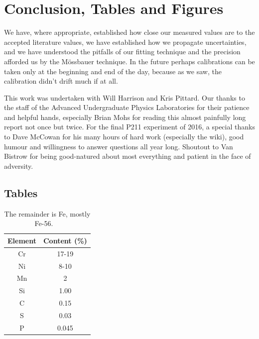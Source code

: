 \documentclass[reprint, nobibnotes, amssymb, amsmath, amsfonts, mathtools, mathrsfs, floatfix]{revtex4-1}
\newcommand{\moss}{M\"{o}ssbauer }
\begin{document}
  \section{Conclusion, Tables and Figures}
    We have, where appropriate, established how close our measured values are to the accepted literature values, we have established how we propagate uncertainties, and we have understood the pitfalls of our fitting technique and the precision afforded us by the \moss technique.  In the future perhaps calibrations can be taken only at the beginning and end of the day, because as we saw, the calibration didn't drift much if at all.

    This work was undertaken with Will Harrison and Kris Pittard.  Our thanks to the staff of the Advanced Undergraduate Physics Laboratories for their patience and helpful hands, especially Brian Mohs for reading this almost painfully long report not once but twice.  For the final P211 experiment of 2016, a special thanks to Dave McCowan for his many hours of hard work (especially the wiki), good humour and willingness to answer questions all year long.  Shoutout to Van Bistrow for being good-natured about most everything and patient in the face of adversity.

    \subsection{Tables}
      \begin{table}[h]
        \centering
        \begin{tabular}{|c|c|}
          \hline
          Element & Content (\%) \\ \hline
          Cr & 17-19 \\ \hline
          Ni & 8-10 \\ \hline
          Mn & 2 \\ \hline
          Si & 1.00 \\ \hline
          C & 0.15 \\ \hline
          S & 0.03 \\ \hline
          P & 0.045 \\ \hline
        \end{tabular}
        \caption{The remainder is Fe, mostly Fe-56.~\cite{stainless_chemical_makeup}~\label{tab:SS_chemical_makeup}}
      \end{table}
\end{document}
